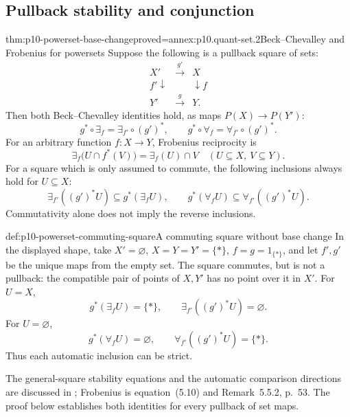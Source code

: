 \subsection{Pullback stability and conjunction}
\label{sec:p10-powerset-base-change}

\begin{hbtheorem}{thm:p10-powerset-base-change}{proved=annex:p10.quant-set.2}{Beck--Chevalley and Frobenius for powersets}
Suppose the following is a pullback square of sets:
\[
\begin{array}{ccc}
 X'&\xrightarrow{\ g'\ }&X\\
 {\scriptstyle f'}\downarrow&&\downarrow{\scriptstyle f}\\
 Y'&\xrightarrow{\ g\ }&Y.
\end{array}
\]
Then both Beck--Chevalley identities hold, as maps
\(P(X)\to P(Y')\):
\[
              g^*\circ\exists_f=\exists_{f'}\circ(g')^*,
              \qquad
              g^*\circ\forall_f=\forall_{f'}\circ(g')^*.
\]
For an arbitrary function \(f:X\to Y\), Frobenius reciprocity is
\[
             \exists_f\bigl(U\cap f^*(V)\bigr)
                         =\exists_f(U)\cap V
                \quad(U\subseteq X,\ V\subseteq Y).
\]
For a square which is only assumed to commute, the following
inclusions always hold for \(U\subseteq X\):
\[
 \exists_{f'}((g')^*U)\subseteq g^*(\exists_fU),
 \qquad
 g^*(\forall_fU)\subseteq\forall_{f'}((g')^*U).
\]
Commutativity alone does not imply the reverse inclusions.
\end{hbtheorem}

\begin{hbexample}{def:p10-powerset-commuting-square}{A commuting square without base change}
In the displayed shape, take
\(X'=\varnothing\), \(X=Y=Y'=\{*\}\), \(f=g=1_{\{*\}}\),
and let \(f',g'\) be the unique maps from the empty set.
The square commutes, but is not a pullback: the compatible
pair of points of \(X,Y'\) has no point over it in \(X'\).
For \(U=X\),
\[
             g^*(\exists_fU)=\{*\},\qquad
             \exists_{f'}((g')^*U)=\varnothing.
\]
For \(U=\varnothing\),
\[
             g^*(\forall_fU)=\varnothing,\qquad
             \forall_{f'}((g')^*U)=\{*\}.
\]
Thus each automatic inclusion can be strict.
\end{hbexample}

The general-square stability equations and the automatic
comparison directions are discussed in
\cite[Remark~5.6.6, pp.~58--59]{Pitts1995Draft};
Frobenius is equation~(5.10) and Remark~5.5.2, p.~53.
The proof below establishes both identities for every pullback
of set maps.

